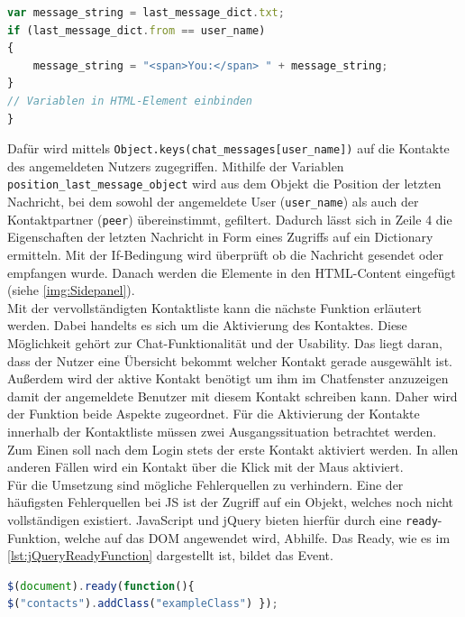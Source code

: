 \documentclass[a4paper,titlepage,halfparskip,12pt]{scrreprt}
\begin{document}
\begin{onehalfspacing}
\begin{lstlisting}[language=Javascript,caption=HTML Elemente für \texttt{fillInContactPeers()},label={lst:HTMLElementsForContaclistfunction}]
var message_string = last_message_dict.txt;
if (last_message_dict.from == user_name)
{
	message_string = "<span>You:</span> " + message_string;
}
// Variablen in HTML-Element einbinden
}
\end{lstlisting}
Dafür wird mittels \texttt{Object.keys(chat\_messages[user\_name])} auf die Kontakte des angemeldeten Nutzers zugegriffen. Mithilfe der Variablen \texttt{position\_last\_message\_object} wird aus dem Objekt die Position der letzten Nachricht, bei dem sowohl der angemeldete User (\texttt{user\_name}) als auch der Kontaktpartner (\texttt{peer}) übereinstimmt, gefiltert. Dadurch lässt sich in Zeile 4 die Eigenschaften der letzten Nachricht in Form eines Zugriffs auf ein Dictionary ermitteln. Mit der If-Bedingung wird überprüft ob die Nachricht gesendet oder empfangen wurde. Danach werden die Elemente in den \acs{HTML}-Content eingefügt (siehe \autoref{img:Sidepanel}).\\
Mit der vervollständigten Kontaktliste kann die nächste Funktion erläutert werden. Dabei handelts es sich um die Aktivierung des Kontaktes. Diese Möglichkeit gehört zur Chat-Funktionalität und der Usability. Das liegt daran, dass der Nutzer eine Übersicht bekommt welcher Kontakt gerade ausgewählt ist. Außerdem wird der aktive Kontakt benötigt um ihm im Chatfenster anzuzeigen damit der angemeldete Benutzer mit diesem Kontakt schreiben kann. Daher wird der Funktion beide Aspekte zugeordnet. Für die Aktivierung der Kontakte innerhalb der Kontaktliste müssen zwei Ausgangssituation betrachtet werden. Zum Einen soll nach dem Login stets der erste Kontakt aktiviert werden. In allen anderen Fällen wird ein Kontakt über die Klick mit der Maus aktiviert.\\
Für die Umsetzung sind mögliche Fehlerquellen zu verhindern. Eine der häufigsten Fehlerquellen bei \ac{JS} ist der Zugriff auf ein Objekt, welches noch nicht vollständigen existiert. JavaScript und jQuery bieten hierfür durch eine \texttt{ready}-Funktion, welche auf das \ac{DOM} angewendet wird, Abhilfe. Das \glqq Ready\grqq, wie es im \autoref{lst:jQueryReadyFunction} dargestellt ist, bildet das Event.

\begin{lstlisting}[language=Javascript,caption= Ready() Funktion von jQuery,label={lst:jQueryReadyFunction}]
$(document).ready(function(){
$("contacts").addClass("exampleClass") });
\end{lstlisting}


\end{onehalfspacing}
\end{document}
